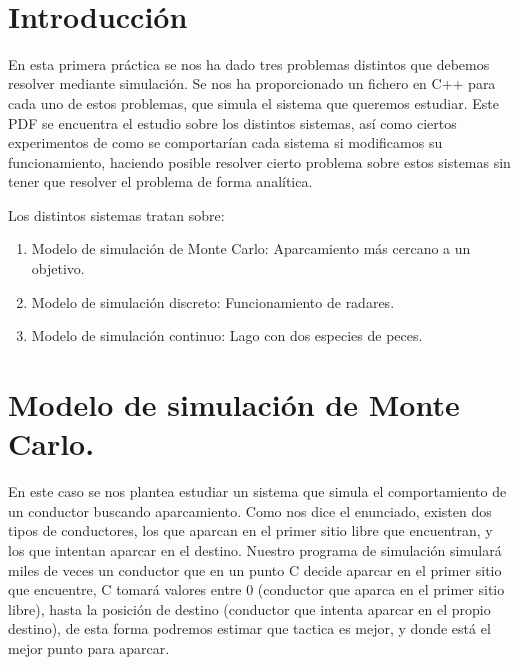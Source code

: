\documentclass[12pt, spanish]{article}
\makeatletter
\let\thedate\@date
\makeatother
\begin{document}
\begin{titlepage}
    {\large \thedate}\\[0.5cm]
    {\doclicenseThis}

    \vfill

\end{titlepage}


\tableofcontents
\pagebreak



\section*{Introducción}

En esta primera práctica se nos ha dado tres problemas distintos que debemos resolver mediante simulación. Se nos ha proporcionado un fichero en C++ para cada uno de estos problemas, que simula el sistema que queremos estudiar. Este PDF se encuentra el estudio sobre los distintos sistemas, así como ciertos experimentos de como se comportarían cada sistema si modificamos su funcionamiento, haciendo posible resolver cierto problema sobre estos sistemas sin tener que resolver el problema de forma analítica.

Los distintos sistemas tratan sobre:

\begin{enumerate}
	\item Modelo de simulación de Monte Carlo: Aparcamiento más cercano a un objetivo.
	\item Modelo de simulación discreto: Funcionamiento de radares.
	\item Modelo de simulación continuo: Lago con dos especies de peces.
\end{enumerate}


\section{Modelo de simulación de Monte Carlo.}

En este caso se nos plantea estudiar un sistema que simula el comportamiento de un conductor buscando aparcamiento. Como nos dice el enunciado, existen dos tipos de conductores, los que aparcan en el primer sitio libre que encuentran, y los que intentan aparcar en el destino. Nuestro programa de simulación simulará miles de veces un conductor que en un punto C decide aparcar en el primer sitio que encuentre, C tomará valores entre 0 (conductor que aparca en el primer sitio libre), hasta la posición de destino (conductor que intenta aparcar en el propio destino), de esta forma podremos estimar que tactica es mejor, y donde está el mejor punto para aparcar.
\end{document}
